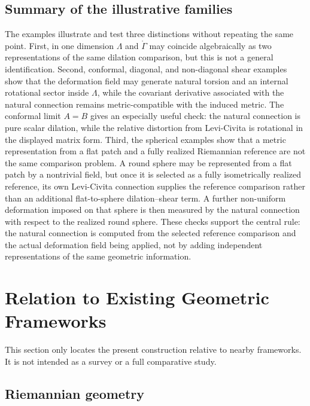 \documentclass[12pt]{amsart}
\theoremstyle{definition}
\theoremstyle{remark}
\begin{document}
\subsection{Summary of the illustrative families}

The examples illustrate and test three distinctions without repeating the same point.  First, in one dimension \(\Lambda\) and \(\mathring\Gamma\) may coincide algebraically as two representations of the same dilation comparison, but this is not a general identification.  Second, conformal, diagonal, and non-diagonal shear examples show that the deformation field may generate natural torsion and an internal rotational sector inside \(\Lambda\), while the covariant derivative associated with the natural connection remains metric-compatible with the induced metric.  The conformal limit \(A=B\) gives an especially useful check: the natural connection is pure scalar dilation, while the relative distortion from Levi-Civita is rotational in the displayed matrix form.  Third, the spherical examples show that a metric representation from a flat patch and a fully realized Riemannian reference are not the same comparison problem.  A round sphere may be represented from a flat patch by a nontrivial field, but once it is selected as a fully isometrically realized reference, its own Levi-Civita connection supplies the reference comparison rather than an additional flat-to-sphere dilation--shear term.  A further non-uniform deformation imposed on that sphere is then measured by the natural connection with respect to the realized round sphere.  These checks support the central rule: the natural connection is computed from the selected reference comparison and the actual deformation field being applied, not by adding independent representations of the same geometric information.

\section{Relation to Existing Geometric Frameworks}\label{sec:relations}

This section only locates the present construction relative to nearby frameworks.  It is not intended as a survey or a full comparative study.

\subsection{Riemannian geometry}
\end{document}
